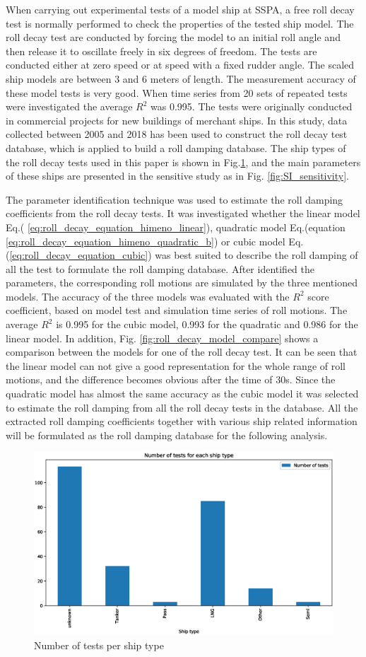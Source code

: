 When carrying out experimental tests of a model ship at SSPA, a free roll decay test is normally performed to check the properties of the tested ship model.
The roll decay test are conducted by forcing the model to an initial roll angle and then release it to oscillate freely in six degrees of freedom. The tests are conducted either  at zero speed or at speed with a fixed rudder angle. The scaled ship models are between 3 and 6 meters of length. The measurement accuracy of these model tests is very good. When time series from 20 sets of repeated tests were investigated the average $R^2$ was 0.995. The tests were originally conducted in commercial projects for new buildings of merchant ships. In this study, data collected between 2005 and 2018 has been used to construct the roll decay test database, which is applied to build a roll damping database. The ship types of the roll decay tests used in this paper is shown in Fig.\ref{fig:ship_types}, and the main parameters of these ships are presented in the sensitive study as in Fig. \ref{fig:SI_sensitivity}. 


The parameter identification technique was used to estimate the roll damping coefficients from the roll decay tests. It was investigated whether the linear model Eq.( \ref{eq:roll_decay_equation_himeno_linear}), quadratic model Eq.(equation \ref{eq:roll_decay_equation_himeno_quadratic_b}) or cubic model Eq.(\ref{eq:roll_decay_equation_cubic}) was best suited to describe the roll damping of all the test to formulate the roll damping database. After identified the parameters, the corresponding roll motions are simulated by the three mentioned models. The accuracy of the three models was evaluated with the $R^2$ score coefficient, based on model test and simulation time series of roll motions.
The average $R^2$ is 0.995 for the cubic model, 0.993 for the quadratic and 0.986 for the linear model. In addition, Fig. \ref{fig:roll_decay_model_compare} shows a comparison between the models for one of the roll decay test. It can be seen that the linear model can not give a good representation for the whole range of roll motions, and the difference becomes obvious after the time of 30s. Since the quadratic model has almost the same accuracy as the cubic model it was selected to estimate the roll damping from all the roll decay tests in the database. All the extracted roll damping coefficients together with various ship related information will be formulated as the roll damping database for the following analysis.

\begin{figure}[H]
    \centering
    \includegraphics[width=0.5\columnwidth]{figures/ship_types.eps}
    \caption{Number of tests per ship type}
    \label{fig:ship_types}
\end{figure}

